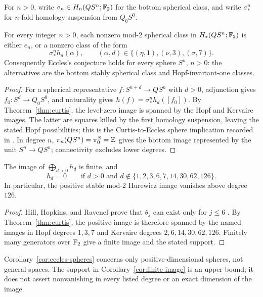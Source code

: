 For \(n>0\), write \(e_n\in H_n(QS^n;\mathbb F_2)\) for the bottom spherical
class, and write \(\sigma_*^n\) for \(n\)-fold homology suspension from
\(Q_0S^0\).

\begin{corollary}\label{cor:eccles-spheres}
For every integer \(n>0\), each nonzero mod-2 spherical class in
\(H_*(QS^n;\mathbb F_2)\) is either \(e_n\), or a nonzero class of the form
\[
 \sigma_*^n h_d(\alpha),\qquad
 (\alpha,d)\in\{(\eta,1),(\nu,3),(\sigma,7)\}.
\]
Consequently Eccles's conjecture holds for every sphere \(S^n\), \(n>0\):
the alternatives are the bottom stably spherical class and
Hopf-invariant-one classes.
\end{corollary}
\begin{proof}
For a spherical representative \(f:S^{n+d}\to QS^n\) with \(d>0\),
adjunction gives \(f_0:S^d\to Q_0S^0\), and naturality gives
\(h(f)=\sigma_*^n h_d([f_0])\). By Theorem~\ref{thm:curtis}, the
level-zero image is spanned by the Hopf and Kervaire images. The latter
are squares killed by the first homology suspension, leaving the stated
Hopf possibilities; this is the Curtis-to-Eccles sphere implication
recorded in \cite[Chapter~5, pp.~81--82]{Zare2009Thesis}. In degree
\(n\), \(\pi_n(QS^n)=\pi_0^S=\mathbb Z\) gives the bottom image represented by
the unit \(S^n\to QS^n\); connectivity excludes lower degrees.
\end{proof}

\begin{corollary}\label{cor:finite-image}
The image of \(\bigoplus_{d>0}h_d\) is finite, and
\[
 h_d=0\qquad\text{if }d>0\text{ and }
 d\notin\{1,2,3,6,7,14,30,62,126\}.
\]
In particular, the positive stable mod-2 Hurewicz image vanishes above
degree \(126\).
\end{corollary}
\begin{proof}
Hill, Hopkins, and Ravenel prove that \(\theta_j\) can exist only for
\(j\le6\) \cite[Theorem~1.1]{HillHopkinsRavenel2016}. By Theorem~\ref{thm:curtis},
the positive image is therefore spanned by the named images in Hopf degrees
\(1,3,7\) and Kervaire degrees \(2,6,14,30,62,126\). Finitely many
generators over \(\mathbb F_2\) give a finite image and the stated support.
\end{proof}

Corollary~\ref{cor:eccles-spheres} concerns only positive-dimensional
spheres, not general spaces. The support in Corollary~\ref{cor:finite-image}
is an upper bound; it does not assert nonvanishing in every listed degree
or an exact dimension of the image.

